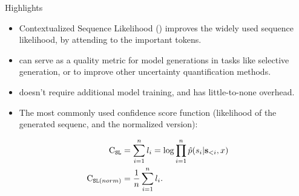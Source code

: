 \documentclass[final]{beamer}
\newlength{\sepwid}
\newlength{\leftcolwid}
\begin{document}
\begin{frame}[containsverbatim,t] %

\begin{columns}[t] %

\begin{column}{\sepwid}\end{column} %

\begin{column}{\leftcolwid} %


\begin{alertblock}{Highlights}

\begin{itemize}
\item Contextualized Sequence Likelihood (\methodname) improves the widely used sequence likelihood, by attending to the important tokens.

\item \methodname can serve as a quality metric for model generations in tasks like selective generation, or to improve other uncertainty quantification methods.

\item \methodname doesn't require additional model training, and has little-to-none overhead.
\end{itemize}

\end{alertblock}

\begin{block}{\color{mydarkgreen}{Background: Sequence Likelihood}}
\begin{itemize}

\item The most commonly used confidence score function (likelihood of the generated sequenc, and the normalized version):

\begin{align}
    \text{C}_{\texttt{SL}} &= \sum_{i=1}^n l_i = \log{\prod_{i=1}^n \hat{p}(s_i|\mathbf{s}_{<i},x)}\label{eq:confll}\\
    \text{C}_{\texttt{SL}(norm)} &= \frac{1}{n} \sum_{i=1}^n l_i \label{eq:confll:norm}.
\end{align}


\end{itemize}
\end{block}
\end{column}
\end{columns}
\end{frame}
\end{document}
